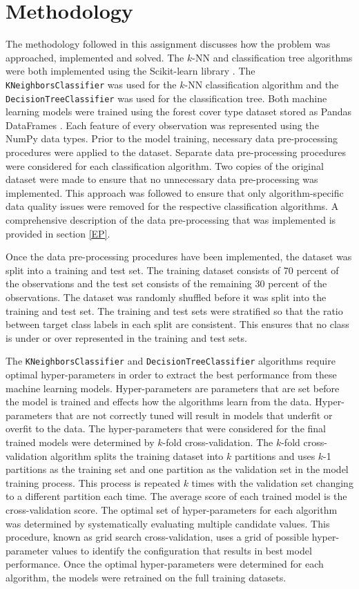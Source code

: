 \documentclass[conference]{IEEEtran}
\begin{document}
	\section{Methodology}\label{M}
	The methodology followed in this assignment discusses how the problem was approached, implemented and solved. The $k$-NN and classification tree algorithms were both implemented using the Scikit-learn library \cite{b3}. The \texttt{KNeighborsClassifier} was used for the $k$-NN classification algorithm and the \texttt{DecisionTreeClassifier} was used for the classification tree. Both machine learning models were trained using the forest cover type dataset stored as Pandas  DataFrames \cite{b2}. Each feature of every observation was represented using the NumPy \cite{b4} data types. Prior to the model training, necessary data pre-processing procedures were applied to the dataset. Separate data pre-processing procedures were considered for each classification algorithm. Two copies of the original dataset were made to ensure that no unnecessary data pre-processing was implemented. This approach was followed to ensure that only algorithm-specific data quality issues were removed for the respective classification algorithms. A comprehensive description of the data pre-processing that was implemented is provided in section \ref{EP}. 
	
	Once the data pre-processing procedures have been implemented, the dataset was split into a training and test set. The training dataset consists of 70 percent of the observations and the test set consists of the remaining 30 percent of the observations. The dataset was randomly shuffled before it was split into the training and test set. The training and test sets were stratified so that the ratio between target class labels in each split are consistent. This ensures that no class is under or over represented in the training and test sets.
	
	
	The \texttt{KNeighborsClassifier} and \texttt{DecisionTreeClassifier} algorithms require optimal hyper-parameters in order to extract the best performance from these machine learning models. Hyper-parameters are parameters that are set before the model is trained and effects how the algorithms learn from the data. Hyper-parameters that are not correctly tuned will result in models that underfit or overfit to the data. The hyper-parameters that were considered for the final trained models were determined by $k$-fold cross-validation. The $k$-fold cross-validation algorithm splits the training dataset into $k$ partitions and uses $k$-1 partitions as the training set and one partition as the validation set in the model training process. This process is repeated $k$ times with the validation set changing to a different partition each time. The average score of each trained model is the cross-validation score. The optimal set of hyper-parameters for each algorithm was determined by systematically evaluating multiple candidate values. This procedure, known as grid search cross-validation, uses a grid of possible hyper-parameter values to identify the configuration that results in best model performance. Once the optimal hyper-parameters were determined for each algorithm, the models were retrained on the full training datasets. 
	
\end{document}
